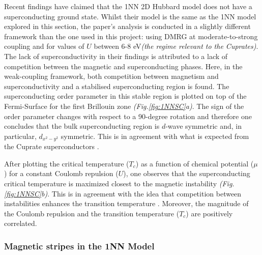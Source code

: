\documentclass[11pt]{article}
\begin{document}
\noindent Recent findings have claimed that the 1NN 2D Hubbard model does not have a superconducting ground state\cite{qin2020absence}. 
Whilst their model is the same as the 1NN model explored in this section, the paper's analysis is conducted in a 
slightly different framework than the one used in this project: using DMRG \cite{white1992density} 
at moderate-to-strong coupling and for values of $U$ between 6-8 eV\textit{(the 
regime relevant to the Cuprates)}.
The lack of superconductivity in their findings is attributed to a lack of competition 
between the magnetic and superconducting phases. Here, in the weak-coupling framework, both  competition between magnetism and superconductivity and 
a stabilised superconducting region is found. The superconducting order parameter in this stable region is plotted on top of the Fermi-Surface for the first Brillouin zone \textit{(Fig.\ref{fig:1NNSC}a)}.
The sign of the order parameter changes with respect to a 90-degree rotation and therefore one concludes that
the bulk superconducting region is $d$-wave symmetric and, in particular, $d_{x^2-y^2}$ symmetric. This is in agreement with what is expected from the Cuprate superconductors \cite{tsuei2000pairing}.\par
\medskip
\noindent 
After plotting the critical temperature ($T_c$) as a function of chemical potential ($\mu$) for a constant Coulomb repulsion ($U$), one observes that
the superconducting critical temperature is maximized closest to the magnetic instability \textit{(Fig.\ref{fig:1NNSC}b)}.
This is in agreement with the idea that competition between instabilities
enhances the transition temperature \cite{maple1995interplay,sun2016dome}. Moreover, the magnitude of the Coulomb repulsion and the transition  temperature ($T_c$) are positively correlated. 





\subsubsection{Magnetic stripes in the 1NN Model}
\label{subsec:Stripes1NN}
\end{document}
